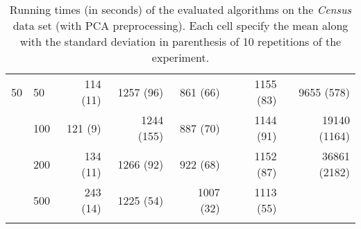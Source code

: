 \begin{longtable}{llrrrrr}
 \midrule
50 & 50  &  114 (11) &      1257 (96) &   861 (66) &            1155 (83) &    9655 (578) \\
   & 100 &   121 (9) &     1244 (155) &   887 (70) &            1144 (91) &  19140 (1164) \\
   & 200 &  134 (11) &      1266 (92) &   922 (68) &            1152 (87) &  36861 (2182) \\
   & 500 &  243 (14) &      1225 (54) &  1007 (32) &            1113 (55) &            \\
\bottomrule
\caption{Running times (in seconds) of the evaluated algorithms on the \textit{Census} data set (with PCA preprocessing). Each cell specify the mean along with the standard deviation in parenthesis of 10 repetitions of the experiment.}
\label{tab:running-time-mean-census-pca}
\end{longtable}

